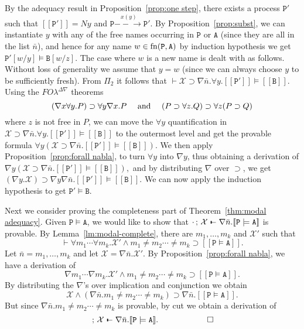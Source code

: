 \documentclass{acmtrans2m}
\newcommand \stf[2] {#1 \models #2}
\def\Xscr{{\mathcal X}}
\def\Api{{\mathtt A}}
\def\Bpi{{\mathtt B}}
\def\Ppi{{\mathtt P}}
\def\relbar{\mathrel{\smash-}}
\def\joinrelm{\mathrel{\mkern-3.2mu}}
\def\tailpiece{\kern 1pt\vrule height 1ex width 0.3ex depth -.25ex}
\def\seqsym{\mathrel{\tailpiece\joinrelm\relbar}}
\newcommand{\FOL   }{FO\lambda}
\newcommand{\FOLDNb}{\FOL^{\Delta\nabla}}
\newcommand{\NSeq}[3]{#1\,;\,#2 \seqsym #3}
\newcommand{\oimp}{\supset}
\newcommand{\one  }[3]{#1\stackrel{#2}{-\!\!-\!\!\!\rightarrow    } #3}
\newcommand{\trans}[1]{[\![ #1 ]\!]}
\newcommand{\fn}[1]{{\rm fn}(#1)}
\begin{document}
\begin{description}
By the adequacy result in Proposition~\ref{prop:one step},
there exists a process $\Ppi'$ such that $\trans{\Ppi'} = N y$ and $\one \Ppi {x(y)} {\Ppi'}.$
By Proposition~\ref{prop:subst}, we can instantiate $y$ with any of the free names occurring
in $\Ppi$ or $\Api$ (since they are all in the list $\bar n$), and hence for any name $w \in \fn{\Ppi,\Api}$
by induction hypothesis we get $\stf {\Ppi'[w/y]} {\Bpi[w/z]}$. The case where $w$ is a new name
is dealt with as follows. Without loss of generality we assume that $y = w$ (since we can always
choose $y$ to be sufficiently fresh).  
From $\Pi_2$ it follows that $\vdash \Xscr \oimp \nabla \bar n. \forall y. \stf {\trans{\Ppi'}} {\trans{\Bpi}}.$
Using the $\FOLDNb$ theorems
$$
(\nabla x \forall y. P) \oimp \forall y\nabla x.P
\quad
\hbox{ and }
\quad
(P \oimp \forall z.Q) \oimp \forall z(P \oimp Q)
$$
where $z$ is not free in $P$, we can move the $\forall y$ quantification in 
$\Xscr \oimp \nabla \bar n. \forall y. \stf {\trans{\Ppi'}} {\trans{\Bpi}}$ to the outermost level and get
the provable formula 
$\forall y(\Xscr \oimp \nabla \bar n. \stf {\trans{\Ppi'}} {\trans{\Bpi}})$.
We then apply Proposition~\ref{prop:forall nabla}, to turn $\forall y$ into $\nabla y$, thus obtaining
a derivation of 
$
\nabla y(\Xscr \oimp \nabla \bar n. \stf {\trans{\Ppi'}} {\trans{\Bpi}}),
$
and by distributing $\nabla$ over $\oimp$, we get
$(\nabla y.\Xscr) \oimp \nabla y\nabla \bar n.\stf {\trans{\Ppi'}} {\trans{\Bpi}}.$
We can now apply the induction hypothesis to get $\Ppi' \models \Bpi.$
\end{description}

Next we consider proving the completeness part of Theorem~\ref{thm:modal adequacy}.
Given $\Ppi \models \Api$, we would like to show that 
$\NSeq{\cdot}{\Xscr}{\nabla \bar n. \trans {\Ppi \models \Api}}$ is provable.
By Lemma~\ref{lm:modal-complete}, there are $m_1,\ldots, m_k$ and $\Xscr'$ such that
$$
\vdash \forall m_1 \cdots \forall m_k. \Xscr' \land m_1 \not = m_2 \cdots \not = m_k \oimp \trans{\Ppi \models \Api}.
$$ 
Let $\bar n = m_1, \ldots, m_k$ and let $\Xscr = \nabla \bar n.\Xscr'.$
By Proposition~\ref{prop:forall nabla}, we have a derivation of 
$$
\nabla m_1 \cdots \nabla m_k. \Xscr' \land m_1 \not = m_2 \cdots \not = m_k \oimp \trans{\Ppi \models \Api}.
$$
By distributing the $\nabla$'s over implication and conjunction we obtain
$$
\Xscr \land (\nabla \bar n. m_1 \not = m_2 \cdots \not = m_k) \oimp \nabla \bar n. \trans{\Ppi \models \Api}.
$$
But since $\nabla \bar n. m_1 \not = m_2 \cdots \not = m_k$ is provable, by cut we obtain
a derivation of 
$$
\NSeq{}{\Xscr}{\nabla \bar n. \trans{\Ppi \models \Api}.\qquad\qquad\qed}
$$
\end{document}
